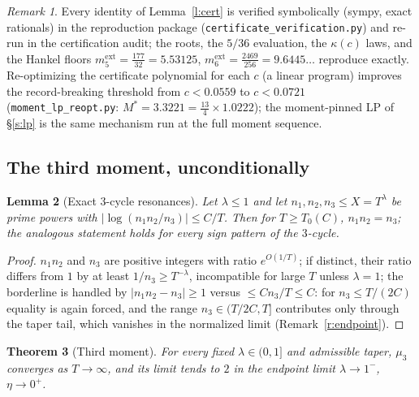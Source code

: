 \documentclass[11pt]{article}
\numberwithin{equation}{section}
\newtheorem{theorem}{Theorem}[section]
\newtheorem{lemma}[theorem]{Lemma}
\theoremstyle{definition}
\theoremstyle{remark}
\newtheorem{remark}[theorem]{Remark}
\begin{document}
\begin{remark}\label{r:certlp}
Every identity of Lemma~\ref{l:cert} is verified symbolically
(sympy, exact rationals) in the reproduction package
(\texttt{certificate\_verification.py}) and re-run in the
certification audit; the roots, the $5/36$ evaluation, the $\kappa(c)$
laws, and the Hankel floors $m_5^{\mathrm{ext}}=\tfrac{177}{32}
=5.53125$, $m_6^{\mathrm{ext}}=\tfrac{2469}{256}=9.6445\ldots$
reproduce exactly. Re-optimizing the certificate polynomial for
each $c$ (a linear program) improves the record-breaking
threshold from $c<0.0559$ to $c<0.0721$
(\texttt{moment\_lp\_reopt.py}: $M^{*}=3.3221=\tfrac{13}4
\times1.0222$); the moment-pinned LP of \S\ref{s:lp} is the same
mechanism run at the full moment sequence.
\end{remark}

\subsection{The third moment, unconditionally}\label{s:cert:m3}

\begin{lemma}[Exact $3$-cycle resonances]\label{l:m3res}
Let $\lambda\le1$ and let $n_1,n_2,n_3\le X=T^{\lambda}$ be prime
powers with $|\log(n_1n_2/n_3)|\le C/T$. Then for $T\ge T_0(C)$,
$n_1n_2=n_3$; the analogous statement holds for every sign
pattern of the $3$-cycle.
\end{lemma}

\begin{proof}
$n_1n_2$ and $n_3$ are positive integers with ratio $e^{O(1/T)}$;
if distinct, their ratio differs from $1$ by at least
$1/n_3\ge T^{-\lambda}$, incompatible for large $T$ unless
$\lambda=1$; the borderline is handled by $|n_1n_2-n_3|\ge1$
versus $\le Cn_3/T\le C$: for $n_3\le T/(2C)$ equality is again
forced, and the range $n_3\in(T/2C,T]$ contributes only through
the taper tail, which vanishes in the normalized limit
(Remark~\ref{r:endpoint}).
\end{proof}

\begin{theorem}[Third moment]\label{t:m3}
For every fixed $\lambda\in(0,1]$ and admissible taper, $\mu_3$
converges as $T\to\infty$, and its limit tends to $2$ in the
endpoint limit $\lambda\to1^-$, $\eta\to0^+$.
\end{theorem}
\end{document}
